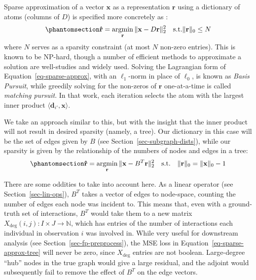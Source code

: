 \documentclass[%
	12pt,
		oneside,
		letterpaper
]{book}
\begin{document}
Sparse approximation of a vector \(\mathbf{x}\) as a representation \(\mathbf{r}\) using a dictionary of atoms (columns of \(D\)) is specified more concretely as \autocite{EfficientimplementationK_Rubinstein2008}:
\begin{equation}\phantomsection\label{eq-sparse-approx}{\mathbf{\hat{r}} = \operatorname*{argmin}_{\mathbf{r}}{\|\mathbf{x}-D\mathbf{r} \|_2^2} \quad \text{s.t.} \|\mathbf{r}\|_0\leq N }\end{equation}
where \(N\) serves as a sparsity constraint (at most \(N\) non-zero entries).
This is known to be NP-hard, though a number of efficient methods to approximate a solution are well-studies and widely used.
Solving the Lagrangian form of Equation~\ref{eq-sparse-approx}, with an \(\ell_1\)-norm in place of \(\ell_0\), is known as \emph{Basis Pursuit}\autocite{SparseApproximateSolutions_Natarajan1995}, while greedily solving for the non-zeros of \(\mathbf{r}\) one-at-a-time is called \emph{matching pursuit}\autocite{Matchingpursuitstime_Mallat1993}.
In that work, each iteration selects the atom with the largest inner product \(\langle \mathbf{d}_{i'},\mathbf{x}\rangle\).

We take an approach similar to this, but with the insight that the inner product will not result in desired sparsity (namely, a tree).
Our dictionary in this case will be the set of edges given by \(B\) (see Section~\ref{sec-subgraph-dists}), while our sparsity is given by the relationship of the numbers of nodes and edges in a tree:
\begin{equation}\phantomsection\label{eq-sparse-approx-tree}{
\mathbf{\hat{r}} = \operatorname*{argmin}_{\mathbf{r}}{\|\mathbf{x}-B^T\mathbf{r} \|_2^2} \quad \text{s.t.}\quad \|\mathbf{r}\|_0 = \|\mathbf{x}\|_0 - 1
}\end{equation}

There are some oddities to take into account here.
As a linear operator (see Section~\ref{sec-lin-ops}), \(B^T\) takes a vector of edges to node-space, counting the number of edges each node was incident to.
This means that, even with a ground-truth set of interactions, \(B^T\) would take them to a new matrix \(X_{\text{deg}}(i,j):I\times J \rightarrow \mathbb{N}\), which has entries of the number of interactions each individual in observation \(i\) was involved in.
While very useful for downstream analysis (see Section~\ref{sec-fp-preprocess}), the MSE loss in Equation~\ref{eq-sparse-approx-tree} will never be zero, since \(X_{\text{deg}}\) entries are not boolean.
Large-degree ``hub'' nodes in the true graph would give a large residual, and the adjoint would subsequently fail to remove the effect of \(B^T\) on the edge vectors.
\end{document}
